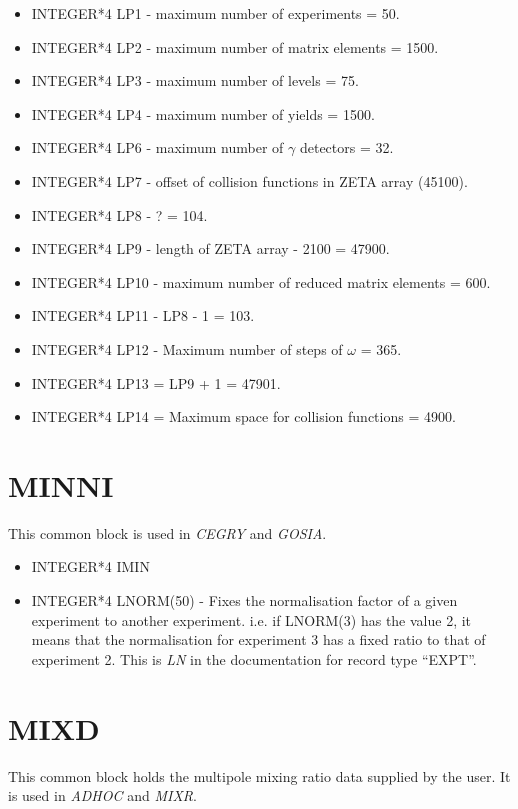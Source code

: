 \begin{itemize}
\item INTEGER*4 LP1 - maximum number of experiments = 50.
\item INTEGER*4 LP2 - maximum number of matrix elements = 1500.
\item INTEGER*4 LP3 - maximum number of levels = 75.
\item INTEGER*4 LP4 - maximum number of yields = 1500.
\item INTEGER*4 LP6 - maximum number of $\gamma$ detectors = 32.
\item INTEGER*4 LP7 - offset of collision functions in ZETA array (45100).
\item INTEGER*4 LP8 - ? = 104.
\item INTEGER*4 LP9 - length of ZETA array - 2100 = 47900.
\item INTEGER*4 LP10 - maximum number of reduced matrix elements = 600.
\item INTEGER*4 LP11 - LP8 - 1 = 103.
\item INTEGER*4 LP12 - Maximum number of steps of $\omega$ = 365.
\item INTEGER*4 LP13 = LP9 + 1 = 47901.
\item INTEGER*4 LP14 = Maximum space for collision functions = 4900.
\end{itemize}

\section{MINNI}

This common block is used in \emph{CEGRY} and \emph{GOSIA}.

\begin{itemize}
\item INTEGER*4 IMIN
\item INTEGER*4 LNORM(50) - Fixes the normalisation factor of a given
experiment to another experiment. i.e. if LNORM(3) has the value 2, it means
that the normalisation for experiment 3 has a fixed ratio to that of
experiment 2. This is \emph{LN} in the documentation for record type ``EXPT''.
\end{itemize}

\section{MIXD}

This common block holds the multipole mixing ratio data supplied by the
user. It is used in \emph{ADHOC} and \emph{MIXR}.

